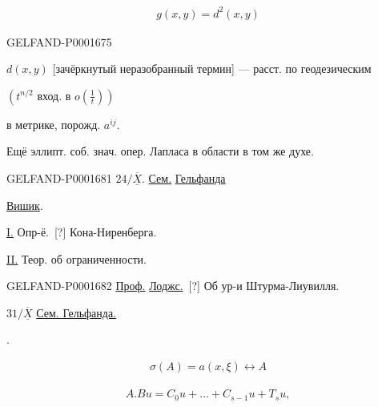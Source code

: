 \begin{gather*}
g(x,y)=d^2(x,y)
\end{gather*}

\begin{GelfandAdjacentEvidence}{GELFAND-P000167}{5}

$d(x,y)$ [зачёркнутый неразобранный термин] — расст. по геодезическим
\end{GelfandAdjacentEvidence}

$(t^{n/2}\text{ вход. в }o(\frac{1}{t}))$

в метрике, порожд. $a^{ij}$.


Ещё эллипт. соб. знач. опер. Лапласа в области в том же духе.



\begin{GelfandAdjacentEvidence}{GELFAND-P000168}{1}
$24/\overline{\underline{X}}$. \underline{Сем.} \underline{Гельфанда}

\underline{Вишик}. 


\underline{I.} Опр-ё.\, [?] Кона-Ниренберга.

\underline{II.} Теор. об ограниченности.
\end{GelfandAdjacentEvidence}


\begin{GelfandAdjacentEvidence}{GELFAND-P000168}{2}
\underline{Проф.} \underline{Лоджс.}\, [?] Об ур-и Штурма-Лиувилля.
\end{GelfandAdjacentEvidence}


$31/\overline{\underline{X}}$ \underline{Сем. Гельфанда.}

. 

\begin{gather*}
\sigma(A)=a(x,\xi)\longleftrightarrow A
\end{gather*}

\begin{gather*}
A.Bu=C_0u+\ldots+C_{s-1}u+T_su,
\end{gather*}

